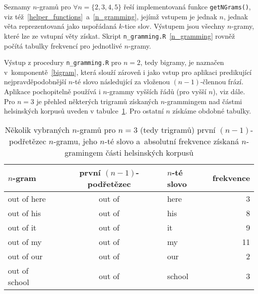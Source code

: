 Seznamy $n$-gramů pro $\forall n = \{2, 3, 4, 5\}$ řeší implementovaná
funkce \texttt{getNGrams()}, viz též~\ref{helper_functions}~a~\ref{n_gramming},
jejímž vstupem je jednak $n$, jednak věta reprezentovaná jako uspořádaná
$k$-tice slov. Výstupem jsou všechny $n$-gramy, které lze ze vstupní věty
získat. Skript \texttt{n\_gramming.R}~\ref{n_gramming} rovněž počítá tabulky
frekvencí pro jednotlivé $n$-gramy.

Výstup z procedury \texttt{n\_gramming.R} pro $n = 2$, tedy bigramy, je
naznačen v~komponentě~\ref{bigram}, která slouží zároveň i jako vstup pro
aplikaci predikující nejpravděpodobnější $n$-té slovo
následující za vloženou
$(n - 1)$-člennou frází.
Aplikace pochopitelně používá i $n$-grammy vyšších
řádů (pro vyšší $n$), viz dále. Pro $n = 3$ je přehled některých trigramů
získaných $n$-grammingem nad částmi helsinských korpusů uveden
v tabulce~\ref{trigramy}. Pro ostatní $n$ získáme obdobné tabulky.

\begin{table}[h]
\centering
\begin{tabular}{lclr}
    \hline
    $n$-gram & první $(n-1)$-podřetězec & $n$-té slovo & frekvence \\
    \hline
    out of here & out of & here & 3 \\
    out of his & out of & his & 8 \\
    out of it & out of & it & 9 \\
    out of my & out of & my & 11 \\
    out of our & out of & our & 2 \\
    out of school & out of & school & 3 \\
    \hline
\end{tabular}
\captionsetup{width = 0.77\textwidth}
\caption{Několik vybraných $n$-gramů pro $n = 3$ (tedy trigramů) %
         první $(n-1)$-podřetězec $n$-gramu, jeho $n$-té slovo %
         a~absolutní frekvence získaná $n$-gramingem %
         části helsinských korpusů\label{trigramy}}
\end{table}




\newpage







